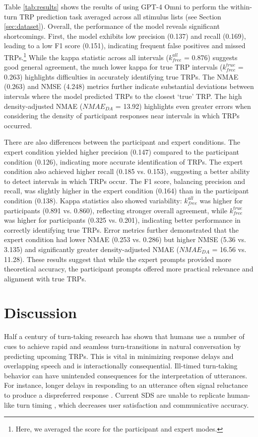 Table \ref{tab:results} shows the results of using GPT-4 Omni to perform the within-turn TRP prediction task averaged across all stimulus lists (see Section \ref{sec:dataset}). Overall, the performance of the model reveals significant shortcomings. First, the model exhibits low precision (0.137) and recall (0.169), leading to a low F1 score (0.151), indicating frequent false positives and missed TRPs.\footnote{Here, we averaged the score for the participant and expert modes.} While the kappa statistic across all intervals ($k_{free}^{all}$ = 0.876) suggests good general agreement, the much lower kappa for true TRP intervals ($k_{free}^{true}$ = 0.263) highlights difficulties in accurately identifying true TRPs. The NMAE (0.263) and NMSE (4.248) metrics further indicate substantial deviations between intervals where the model predicted TRPs to the closest `true' TRP. The high density-adjusted NMAE ($\textit{NMAE}_{DA}$ = 13.92) highlights even greater errors when considering the density of participant responses near intervals in which TRPs occurred.

There are also differences between the participant and expert conditions. The expert condition yielded higher precision (0.147) compared to the participant condition (0.126), indicating more accurate identification of TRPs. The expert condition also achieved higher recall (0.185 vs. 0.153), suggesting a better ability to detect intervals in which TRPs occur. The F1 score, balancing precision and recall, was slightly higher in the expert condition (0.164) than in the participant condition (0.138). Kappa statistics also showed variability: $k_{free}^{all}$ was higher for participants (0.891 vs. 0.860), reflecting stronger overall agreement, while $k_{free}^{true}$ was higher for participants (0.325 vs. 0.201), indicating better performance in correctly identifying true TRPs. Error metrics further demonstrated that the expert condition had lower NMAE (0.253 vs. 0.286) but higher NMSE (5.36 vs. 3.135) and significantly greater density-adjusted NMAE ($\textit{NMAE}_{DA}$ = 16.56 vs. 11.28). These results suggest that while the expert prompts provided more theoretical accuracy, the participant prompts offered more practical relevance and alignment with true TRPs.


\section{Discussion}
\label{sec:discussion}

Half a century of turn-taking research has shown that humans use a number of cues to achieve rapid and seamless turn-transitions in natural conversation by predicting upcoming TRPs. This is vital in minimizing response delays and overlapping speech and is interactionally consequential. Ill-timed turn-taking behavior can have unintended consequences for the interpretation of utterances. For instance, longer delays in responding to an utterance often signal reluctance to produce a dispreferred response \cite{deRuiter2019TurnTaking,kendrick2015timing}. Current SDS are unable to replicate human-like turn timing \cite{skantze2021turnreview}, which decreases user satisfaction and communicative accuracy.

